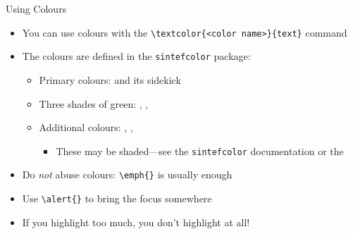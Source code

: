 \begin{frame}[fragile]{Using Colours}
	\begin{itemize}[<alert@2>]
		\item You can use colours with the
		      \verb|\textcolor{<color name>}{text}| command
		\item The colours are defined in the \texttt{sintefcolor} package:
		      \begin{itemize}
			      \item Primary colours:  and its sidekick
			      \item Three shades of green: ,
			            , 
			      \item Additional colours: , ,
			            \begin{itemize}
				            \item These may be shaded---see the \verb|sintefcolor| documentation or
				                  the 
			            \end{itemize}
		      \end{itemize}
		\item Do \emph{not} abuse colours: \verb|\emph{}| is usually enough
		\item Use \verb|\alert{}| to bring the \alert<2->{focus} somewhere
		\item<2- | alert@2> If you highlight too much, you don't highlight at all!
	\end{itemize}
\end{frame}
